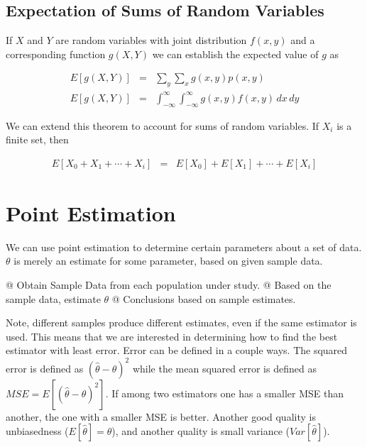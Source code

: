     \subsection{Expectation of Sums of Random Variables}
    If $X$ and $Y$ are random variables with joint distribution $f(x, y)$ and a corresponding function $g(X, Y)$ we can
    establish the expected value of $g$ as

    \begin{equation*}
        \begin{aligned}
            E\left[ g(X, Y) \right] &=& \sum\limits_y \sum\limits_x g(x, y) p(x, y)\\
            E\left[ g(X, Y) \right] &=& \int_{-\infty}^\infty \int_{-\infty}^\infty g(x, y) f(x, y) \, dx \, dy
        \end{aligned}
    \end{equation*}

    We can extend this theorem to account for sums of random variables. If $X_i$ is a finite set, then

    \begin{equation*}
        \begin{aligned}
            E\left[ X_0 + X_1 + \cdots + X_i \right] &=& E[X_0] + E[X_1] + \cdots + E[X_i]
        \end{aligned}
    \end{equation*}

\section{Point Estimation}
We can use point estimation to determine certain parameters about a set of data. $\theta$ is merely an estimate for some
parameter, based on given sample data.

\NewList
\begin{easylist}
    @ Obtain Sample Data from each population under study.
    @ Based on the sample data, estimate $\theta$
    @ Conclusions based on sample estimates.
\end{easylist}

Note, different samples produce different estimates, even if the same estimator is used. This means that we are
interested in determining how to find the best estimator with least error. Error can be defined in a couple ways. The
squared error is defined as ${( \hat{\theta} - \theta )}^2$ while the mean squared error is defined as
$MSE=E[{( \hat{\theta} - \theta )}^2]$. If among two estimators one has a smaller MSE than another, the one
with a smaller MSE is better. Another good quality is unbiasedness ($E[\hat{\theta}] = \theta$), and another quality is
small variance ($Var[\hat{\theta}]$).

